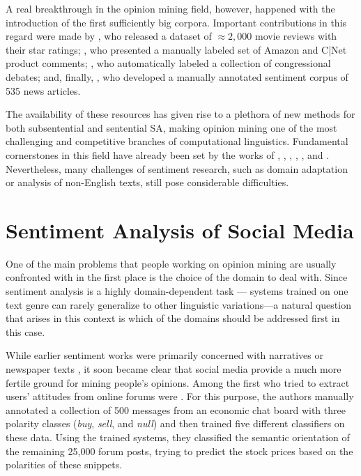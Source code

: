 A real breakthrough in the opinion mining field, however, happened
with the introduction of the first sufficiently big corpora.
Important contributions in this regard were made by
\citet{Pang:04,Pang:05}, who released a dataset of $\approx2,000$
movie reviews with their star ratings; \citet{Hu:04}, who presented a
manually labeled set of Amazon and C|Net product comments;
\citet{Thomas:06}, who automatically labeled a collection of
congressional debates; and, finally, \citet{Wiebe:05}, who developed a
manually annotated sentiment corpus of 535 news articles.

The availability of these resources has given rise to a plethora of
new methods for both subsentential and sentential SA, making opinion
mining one of the most challenging and competitive branches of
computational linguistics.  Fundamental cornerstones in this field
have already been set by the works of \citet{Pang:02},
\citet{Wiebe:05}, \citet{Wilson:05}, \citet{Breck:07},
\citet{Choi:09,Choi:10}, and \citet{Socher:11, Socher:12}.
Nevertheless, many challenges of sentiment research, such as domain
adaptation or analysis of non-English texts, still pose considerable
difficulties.

\section{Sentiment Analysis of Social Media}

One of the main problems that people working on opinion mining are
usually confronted with in the first place is the choice of the domain
to deal with. Since sentiment analysis is a highly domain-dependent
task \citep[see][]{Aue:05,Blitzer:07,Li:08}---\ie{} systems trained on
one text genre can rarely generalize to other linguistic
variations---a natural question that arises in this context is which
of the domains should be addressed first in this case.

While earlier sentiment works were primarily concerned with narratives
\citep{Wiebe:90a,Wiebe:94} or newspaper texts
\citep{Wiebe:03,Wiebe:05,Bautin:08}, it soon became clear that social
media provide a much more fertile ground for mining people's opinions.
Among the first who tried to extract users' attitudes from online
forums were \citet{Das:01}. For this purpose, the authors manually
annotated a collection of 500 messages from an economic chat board
with three polarity classes (\emph{buy}, \emph{sell}, and \emph{null})
and then trained five different classifiers on these data.  Using the
trained systems, they classified the semantic orientation of the
remaining 25,000 forum posts, trying to predict the stock prices based
on the polarities of these snippets.

